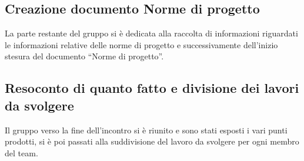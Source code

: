 \subsection{Creazione documento Norme di progetto}
La parte restante del gruppo si è dedicata alla raccolta di informazioni riguardati le informazioni relative delle norme di progetto e successivamente dell’inizio stesura del documento “Norme di progetto”.

\subsection{Resoconto di quanto fatto e divisione dei lavori da svolgere}
Il gruppo verso la fine dell'incontro si è riunito e sono stati esposti i vari punti prodotti, si è poi passati alla suddivisione del lavoro da svolgere per ogni membro del team.
\clearpage